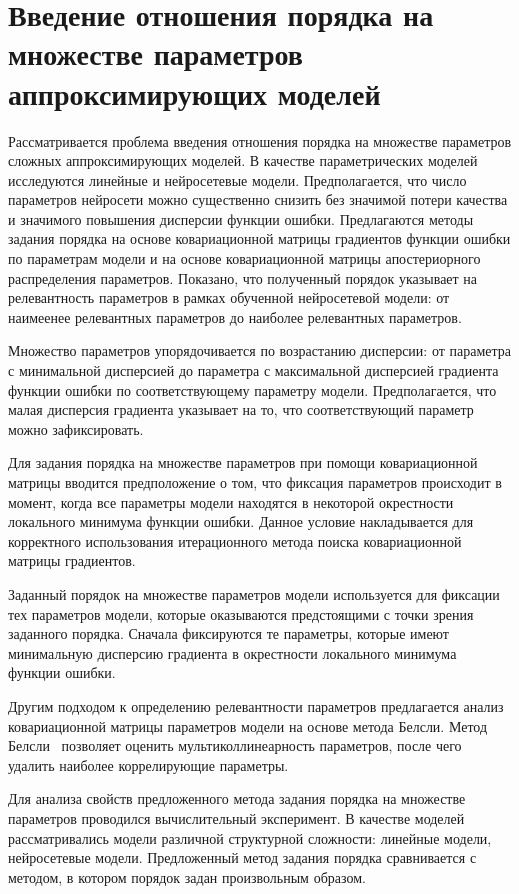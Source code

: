 \chapter{Введение отношения порядка на множестве параметров аппроксимирующих моделей}

Рассматривается проблема введения отношения порядка на множестве параметров сложных аппроксимирующих моделей.
В качестве параметрических моделей исследуются линейные и нейросетевые модели.
Предполагается, что число параметров нейросети можно существенно снизить без значимой потери качества и значимого повышения дисперсии функции ошибки.
Предлагаются методы задания порядка на основе ковариационной матрицы градиентов функции ошибки по параметрам модели и на основе ковариационной матрицы апостериорного распределения параметров.
Показано, что полученный порядок указывает на релевантность параметров в рамках обученной нейросетевой модели: от наимеенее релевантных параметров до наиболее релевантных параметров.

Множество параметров упорядочивается по возрастанию дисперсии: от параметра с минимальной дисперсией до параметра с максимальной дисперсией градиента функции ошибки по соответствующему параметру модели. Предполагается, что малая дисперсия градиента указывает на то, что соответствующий параметр можно зафиксировать.

Для задания порядка на множестве параметров при помощи ковариационной матрицы вводится предположение о том, что фиксация параметров происходит в момент, когда все параметры модели находятся в некоторой окрестности локального минимума функции ошибки. Данное условие накладывается для корректного использования итерационного метода поиска ковариационной матрицы градиентов.

Заданный порядок на множестве параметров модели используется для фиксации тех параметров модели, которые оказываются предстоящими с точки зрения заданного порядка. Сначала фиксируются те параметры, которые имеют минимальную дисперсию градиента в окрестности локального минимума функции ошибки.

Другим подходом к определению релевантности параметров предлагается анализ ковариационной матрицы параметров модели на основе метода Белсли. Метод Белсли~\cite{neychev2016} позволяет оценить мультиколлинеарность параметров, после чего удалить наиболее коррелирующие параметры.

Для анализа свойств предложенного метода задания порядка на множестве параметров проводился вычислительный эксперимент. В качестве моделей рассматривались модели различной структурной сложности: линейные модели, нейросетевые модели. Предложенный метод задания порядка сравнивается с методом, в котором порядок задан произвольным образом.


